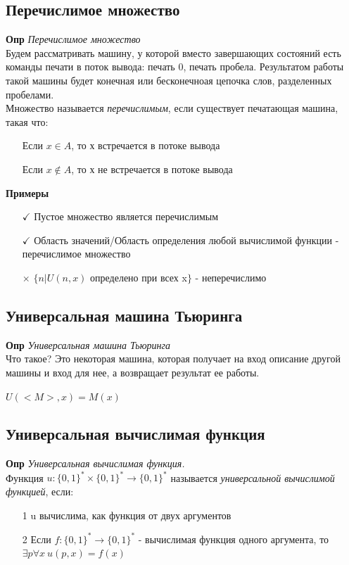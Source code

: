 \subsection{Перечислимое множество}

\textbf{Опр} \textit{Перечислимое множество}\\
Будем рассматривать машину, у которой вместо завершающих состояний есть команды печати в поток вывода: печать 0, печать пробела. Результатом работы такой машины будет конечная или бесконечноая цепочка слов, разделенных пробелами.\\
Множество называется \textit{перечислимым}, если существует печатающая машина, такая что:
\begin{itemize}
    \item [] Если $x \in A$, то х встречается в потоке вывода
     \item [] Если $x \not\in A$, то х не встречается в потоке вывода
\end{itemize}
\textbf{Примеры}
\begin{itemize}
    \item [$\checkmark$] Пустое множество является перечислимым 
    \item [$\checkmark$] Область значений/Область определения любой вычислимой функции - перечислимое множество
    \item[$\times$]  $\{n | U(n, x)$ определено при всех x$\}$ - неперечислимо
\end{itemize}

\subsection{Универсальная машина Тьюринга}

\textbf{Опр} \textit{Универсальная машина Тьюринга}\\
Что такое? Это некоторая машина, которая получает на вход описание другой машины и вход для нее, а возвращает результат ее работы.\\
\begin{center}
    $U(<M>,x) = M(x)$
\end{center}

\subsection{Универсальная вычислимая функция}

\textbf{Опр} \textit{Универсальная вычислимая функция.}\\
Функция $u:\{0,1\}^* \times \{0,1\}^* \rightarrow \{0,1\}^*$ называется \textit{универсальной вычислимой функцией}, если:
\begin{itemize}
    \item [1] u вычислима, как функция от двух аргументов
    \item[2] Если $f:\{0,1\}^* \rightarrow \{0,1\}^* $ - вычислимая функция одного аргумента, то $\exists p \forall x \ u(p,x) = f(x)$ 
\end{itemize}

